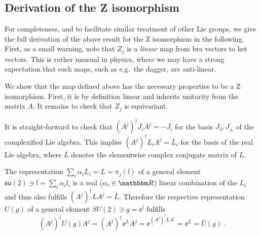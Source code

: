 \subsection{Derivation of the Z isomorphism}
\label{subsec:topo_data:su2:z_iso_derivation}

For completeness, and to facilitate similar treatment of other Lie groups, we give the full derivation of the above result for the Z isomorphism in the following.
%
First, as a small warning, note that $Z_j$ is a \emph{linear} map from bra vectors to ket vectors.
%
This is rather unusual in physics, where we may have a strong expectation that such maps, such as e.g.~the dagger, are anti-linear.

We show that the map defined above has the necessary properties to be a Z isomorphism.
%
First, it is by definition linear and inherits unitarity from the matrix $A$.
%
It remains to check that $Z_j$ is equivariant.

It is straight-forward to check that $(A^j)^\dagger J_i A^j = -J_i$ for the basis $J_3, J_\pm$ of the complexified Lie algebra.
%
This implies $(A^j)^\dagger L_i A^j = \bar{L}_i$ for the basis of the real Lie algebra, where $\bar{L}$ denotes the elementwise complex conjugate matrix of $L$.

The representation $\sum_i \alpha_i L_i = L = \pi_j(l)$ of a general element $\mathfrak{su}(2) \owns l = \sum_i \alpha_i l_i$ is a real ($\alpha_i \in \Rbb$) linear combination of the $L_i$ and thus also fulfills $(A^j)^\dagger L A^j = \bar{L}$.
%
Therefore the respective representation $U(g)$ of a general element $SU(2) \owns g = \ee^l$ fulfills
\begin{equation}
    (A^j)^\dagger U(g) A^j
    = (A^j)^\dagger \ee^L A^j
    = \ee^{(A^j)^\dagger L A^j}
    = \ee^{\bar{L}}
    = \bar{U}(g)
    ~.
\end{equation}

